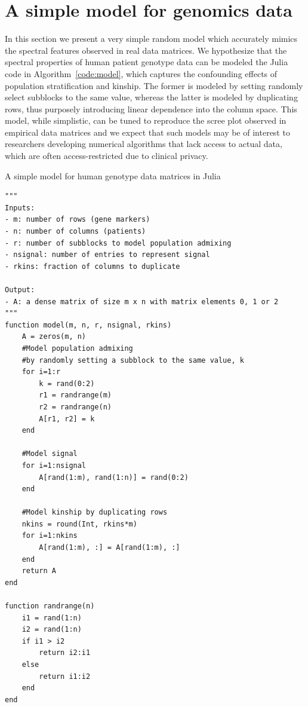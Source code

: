 \documentclass[review]{siamart0516}
\begin{document}
\section{A simple model for genomics data}

In this section we present a very simple random model which accurately mimics
the spectral features observed in real data matrices.
We hypothesize that the spectral properties of human patient genotype data can
be modeled the Julia code in Algorithm~\ref{code:model}, which captures the
confounding effects of population stratification and kinship.
The former is modeled by setting randomly select subblocks to the same value,
whereas the latter is modeled by duplicating rows, thus purposely introducing
linear dependence into the column space. This model, while simplistic, can be
tuned to reproduce the scree plot observed in empirical data matrices and we
expect that such models may be of interest to researchers developing numerical
algorithms that lack access to actual data, which are often access-restricted
due to clinical privacy.

\begin{algorithm}
\caption{A simple model for human genotype data matrices in Julia
\label{code:model}}
\begin{lstlisting}
"""
Inputs:
- m: number of rows (gene markers)
- n: number of columns (patients)
- r: number of subblocks to model population admixing
- nsignal: number of entries to represent signal
- rkins: fraction of columns to duplicate

Output:
- A: a dense matrix of size m x n with matrix elements 0, 1 or 2
"""
function model(m, n, r, nsignal, rkins)
    A = zeros(m, n)
    #Model population admixing
    #by randomly setting a subblock to the same value, k
    for i=1:r
        k = rand(0:2)
        r1 = randrange(m)
        r2 = randrange(n)
        A[r1, r2] = k
    end

    #Model signal
    for i=1:nsignal
        A[rand(1:m), rand(1:n)] = rand(0:2)
    end

    #Model kinship by duplicating rows
    nkins = round(Int, rkins*m)
    for i=1:nkins
        A[rand(1:m), :] = A[rand(1:m), :]
    end
    return A
end

function randrange(n)
    i1 = rand(1:n)
    i2 = rand(1:n)
    if i1 > i2
        return i2:i1
    else
        return i1:i2
    end
end
\end{lstlisting}
\end{algorithm}
\end{document}
